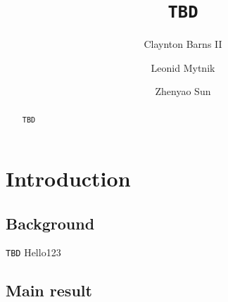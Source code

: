 \documentclass[12pt,a4paper]{amsart}
\numberwithin{equation}{section}
\theoremstyle{plain}
\theoremstyle{remark}
\begin{document}
	\title[]{{\tt TBD}}
	\author[]{Claynton Barns II}
	\address{{\tt TBD}}
	\author[]{Leonid Mytnik}
	\address{{\tt TBD}}
	\author[]{Zhenyao Sun}
	\address{{\tt TBD}}
\begin{abstract}
	{\tt TBD}
\end{abstract}
\maketitle
	
\section{Introduction}
\subsection{Background} 
    {\tt TBD}
    Hello123
   
\subsection{Main result} \label{sec:M} 
\end{document}
